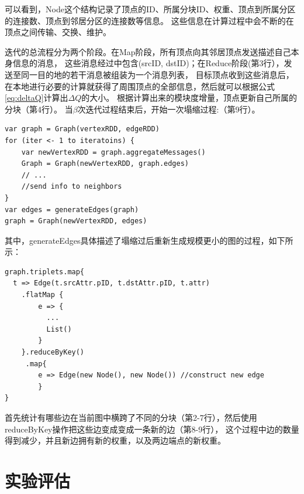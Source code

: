 \documentclass[master]{njuthesis}
\begin{document}
可以看到，Node这个结构记录了顶点的ID、所属分块ID、权重、顶点到所属分区的连接数、顶点到邻居分区的连接数等信息。
这些信息在计算过程中会不断的在顶点之间传输、交换、维护。

迭代的总流程分为两个阶段。在Map阶段，所有顶点向其邻居顶点发送描述自己本身信息的消息，
这些消息经过中包含(srcID, dstID)；在Reduce阶段(第3行），发送至同一目的地的若干消息被组装为一个消息列表，
目标顶点收到这些消息后，在本地进行必要的计算就获得了周围顶点的全部信息，然后就可以根据公式\ref{eq:deltaQ}计算出$\Delta Q$的大小。
根据计算出来的模块度增量，顶点更新自己所属的分块（第4行）。
当$\beta$次迭代过程结束后，开始一次塌缩过程:（第9行）。
\begin{lstlisting}
var graph = Graph(vertexRDD, edgeRDD)
for (iter <- 1 to iteratoins) {
    var newVertexRDD = graph.aggregateMessages()
    Graph = Graph(newVertexRDD, graph.edges)
    // ...
    //send info to neighbors  
}
var edges = generateEdges(graph)
graph = Graph(newVertexRDD, edges)
\end{lstlisting}
其中，generateEdges具体描述了塌缩过后重新生成规模更小的图的过程，如下所示：
\begin{lstlisting}
graph.triplets.map{
  t => Edge(t.srcAttr.pID, t.dstAttr.pID, t.attr)
	.flatMap {
	    e => {
	      ...
	      List()
	    }
	}.reduceByKey()
	 .map{
	    e => Edge(new Node(), new Node()) //construct new edge
	    }
}
\end{lstlisting}
首先统计有哪些边在当前图中横跨了不同的分块（第2-7行），然后使用reduceByKey操作把这些边变成变成一条新的边（第8-9行），
这个过程中边的数量得到减少，并且新边拥有新的权重，以及两边端点的新权重。
\section{实验评估}
\end{document}
